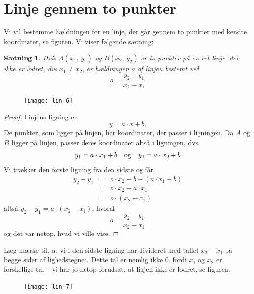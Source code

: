 \documentclass[12pt,oneside,a4paper]{article}
\newcommand{\bas}{\begin{eqnarray*}}
\newcommand{\eas}{\end{eqnarray*}}
\newtheorem{thm}{Sætning}[section]
\begin{document}

\section{Linje gennem to punkter}
Vi vil bestemme hældningen for en linje, der går gennem
to punkter med kendte koordinater, se figuren. Vi viser følgende sætning:
\begin{thm}
    Hvis $A(x_1,\,y_1)$ og $B(x_2,\,y_2)$ er to punkter på en ret linje, der ikke
    er lodret, dvs $x_1\neq x_2$, er hældningen $a$ af linjen bestemt ved
    $$
    a = \frac{y_2-y_1}{x_2-x_1}
    $$
\end{thm}

\begin{figure}[H]
    \centering
    \texttt{[image: lin-6]}
    \label{linear-1}
\end{figure}

\begin{proof}
    Linjens ligning er
    $$
    y = a\cdot x + b.
    $$
    De punkter, som ligger på linjen, har koordinater, der passer i
    ligningen.  Da $A$ og $B$ ligger på linjen, passer deres koordinater altså
    i ligningen, dvs.
    $$
    y_1 = a\cdot x_1 + b \quad {\rm og} \quad y_2 = a\cdot x_2 + b 
    $$
    Vi trækker den første ligning fra den sidste og får
    \bas
    y_2 - y_1 &=& a\cdot x_2 + b - (a\cdot x_1 + b) \\
              &=& a\cdot x_2 - a\cdot x_1 \\
              &=& a\cdot \left(x_2-x_1\right) 
    \eas
    altså $y_2-y_1 = a \cdot \left(x_2-x_1\right)$, hvoraf
    $$
    a = \frac{y_2-y_1}{x_2-x_1}
    $$
    og det var netop, hvad vi ville vise.
\end{proof}

Læg mærke til, at vi i den sidste ligning har divideret med tallet $x_2-x_1$ på
begge sider af lighedstegnet. Dette tal er nemlig ikke $0$, fordi $x_1$ og
$x_2$ er forskellige tal -- vi har jo netop forudsat, at linjen ikke er lodret, se
figuren.

\begin{figure}[H]
    \centering
    \texttt{[image: lin-7]}
    \label{linear-2}
\end{figure}
\end{document}

